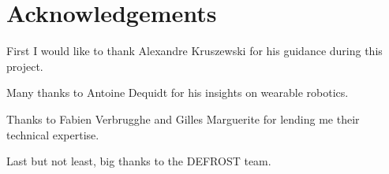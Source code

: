 \chapter{Acknowledgements}
First I would like to thank Alexandre Kruszewski for his guidance during this project.

Many thanks to Antoine Dequidt for his insights on wearable robotics.

Thanks to Fabien Verbrugghe and Gilles Marguerite for lending me their technical expertise.

Last but not least, big thanks to the DEFROST team.
